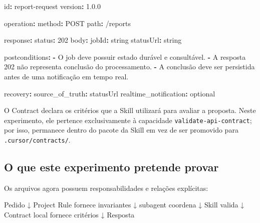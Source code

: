 \documentclass[
  10pt,
  a4paper,
  oneside]{book}
\newenvironment{Shaded}{}{}
\newcommand{\AttributeTok}[1]{\textcolor[rgb]{0.49,0.56,0.16}{#1}}
\newcommand{\DecValTok}[1]{\textcolor[rgb]{0.25,0.63,0.44}{#1}}
\newcommand{\FloatTok}[1]{\textcolor[rgb]{0.25,0.63,0.44}{#1}}
\newcommand{\FunctionTok}[1]{\textcolor[rgb]{0.02,0.16,0.49}{#1}}
\newcommand{\KeywordTok}[1]{\textcolor[rgb]{0.00,0.44,0.13}{\textbf{#1}}}
\newcommand{\NormalTok}[1]{#1}
\renewenvironment{Shaded}{\begin{snugshade}}{\end{snugshade}}%
\begin{document}
\begin{Shaded}
\begin{Highlighting}[]
\FunctionTok{id}\KeywordTok{:}\AttributeTok{ report{-}request}
\FunctionTok{version}\KeywordTok{:}\AttributeTok{ }\FloatTok{1.0.0}

\FunctionTok{operation}\KeywordTok{:}
\AttributeTok{  }\FunctionTok{method}\KeywordTok{:}\AttributeTok{ POST}
\AttributeTok{  }\FunctionTok{path}\KeywordTok{:}\AttributeTok{ /reports}

\FunctionTok{response}\KeywordTok{:}
\AttributeTok{  }\FunctionTok{status}\KeywordTok{:}\AttributeTok{ }\DecValTok{202}
\AttributeTok{  }\FunctionTok{body}\KeywordTok{:}
\AttributeTok{    }\FunctionTok{jobId}\KeywordTok{:}\AttributeTok{ string}
\AttributeTok{    }\FunctionTok{statusUrl}\KeywordTok{:}\AttributeTok{ string}

\FunctionTok{postconditions}\KeywordTok{:}
\AttributeTok{  }\KeywordTok{{-}}\AttributeTok{ O job deve possuir estado durável e consultável.}
\AttributeTok{  }\KeywordTok{{-}}\AttributeTok{ A resposta 202 não representa conclusão do processamento.}
\AttributeTok{  }\KeywordTok{{-}}\AttributeTok{ A conclusão deve ser persistida antes de uma notificação em tempo real.}

\FunctionTok{recovery}\KeywordTok{:}
\AttributeTok{  }\FunctionTok{source\_of\_truth}\KeywordTok{:}\AttributeTok{ statusUrl}
\AttributeTok{  }\FunctionTok{realtime\_notification}\KeywordTok{:}\AttributeTok{ optional}
\end{Highlighting}
\end{Shaded}

O Contract declara os critérios que a Skill utilizará para avaliar a
proposta. Neste experimento, ele pertence exclusivamente à capacidade
\texttt{validate-api-contract}; por isso, permanece dentro do pacote da
Skill em vez de ser promovido para \texttt{.cursor/contracts/}.

\hypertarget{o-que-este-experimento-pretende-provar}{%
\subsection{O que este experimento pretende
provar}\label{o-que-este-experimento-pretende-provar}}

Os arquivos agora possuem responsabilidades e relações explícitas:

\begin{Shaded}
\begin{Highlighting}[]
\NormalTok{Pedido}
\NormalTok{   ↓}
\NormalTok{Project Rule fornece invariantes}
\NormalTok{   ↓}
\NormalTok{subagent coordena}
\NormalTok{   ↓}
\NormalTok{Skill valida}
\NormalTok{   ↓}
\NormalTok{Contract local fornece critérios}
\NormalTok{   ↓}
\NormalTok{Resposta}
\end{Highlighting}
\end{Shaded}
\end{document}
